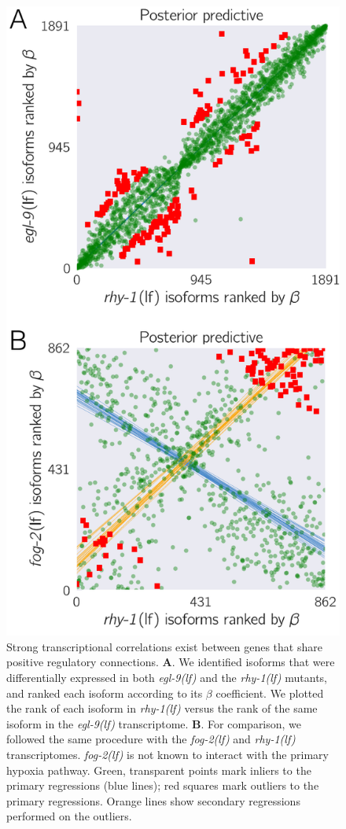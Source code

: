 \documentclass[9pt,twocolumn,twoside]{pnas-new}
\newcommand{\gene}[1]{\mbox{\emph{#1}}}
\newcommand{\fog}{\gene{fog-2(lf)}}
\newcommand{\egl}{\gene{egl-9(lf)}}
\newcommand{\rhy}{\gene{rhy-1(lf)}}
\begin{document}
\begin{figure}[tbhp]
  \centering
  \includegraphics[width=.4\textwidth]{../figs/positive_and_control.pdf}
  \caption{
    Strong transcriptional correlations exist between genes that
    share positive regulatory connections.
    \textbf{A}. We identified
    isoforms that were differentially expressed in both \egl{} and the \rhy{}
    mutants, and ranked each isoform according to its $\beta$ coefficient. We
    plotted the rank of each isoform in \rhy{} versus the rank of the same
    isoform in the \egl{} transcriptome.
    \textbf{B}. For comparison, we followed the same
    procedure with the \fog{} and \rhy{} transcriptomes. \fog{} is not known to
    interact with the primary hypoxia pathway. Green, transparent points mark
    inliers to the primary regressions (blue lines); red squares mark outliers
    to the primary regressions. Orange lines show secondary regressions
    performed on the outliers.
  }
\label{fig:genetic_interactions}
\end{figure}
\end{document}
